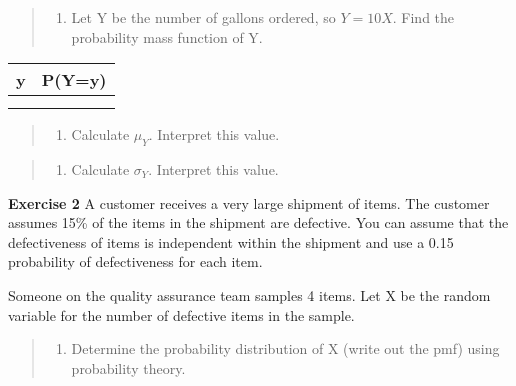\documentclass[
]{article}
\providecommand{\tightlist}{%
  \setlength{\itemsep}{0pt}\setlength{\parskip}{0pt}}
\begin{document}
\begin{quote}
\begin{enumerate}
\def\labelenumi{\alph{enumi}.}
\setcounter{enumi}{1}
\tightlist
\item
  Let Y be the number of gallons ordered, so \(Y=10X\). Find the
  probability mass function of Y.
\end{enumerate}
\end{quote}

\begin{longtable}[]{@{}cc@{}}
\toprule()
y & P(Y=y) \\
\midrule()
\endhead
& \\
& \\
\bottomrule()
\end{longtable}

\begin{quote}
\begin{enumerate}
\def\labelenumi{\alph{enumi}.}
\setcounter{enumi}{2}
\tightlist
\item
  Calculate \(\mu_Y\). Interpret this value.
\end{enumerate}
\end{quote}

\begin{quote}
\begin{enumerate}
\def\labelenumi{\alph{enumi}.}
\setcounter{enumi}{3}
\tightlist
\item
  Calculate \(\sigma_Y\). Interpret this value.
\end{enumerate}
\end{quote}

\vspace{.5cm}

\textbf{Exercise 2} A customer receives a very large shipment of items.
The customer assumes 15\% of the items in the shipment are defective.
You can assume that the defectiveness of items is independent within the
shipment and use a 0.15 probability of defectiveness for each item.

Someone on the quality assurance team samples 4 items. Let X be the
random variable for the number of defective items in the sample.

\begin{quote}
\begin{enumerate}
\def\labelenumi{\alph{enumi}.}
\tightlist
\item
  Determine the probability distribution of X (write out the pmf) using
  probability theory.
\end{enumerate}
\end{quote}
\end{document}
